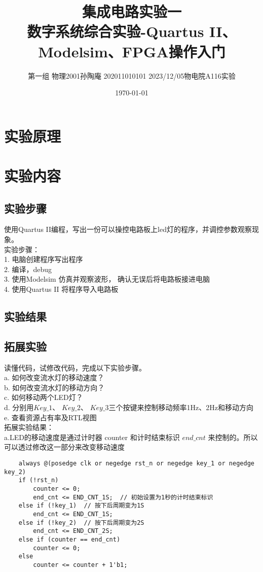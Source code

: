 \documentclass[12pt, a4paper, oneside]{article}
\title{集成电路实验一\\数字系统综合实验-Quartus II、Modelsim、FPGA操作入门}
\date{\today}
\author{第一组 物理2001孙陶庵 202011010101 2023/12/05物电院A116实验}
\begin{document}
\begin{spacing}{2.0}
\tableofcontents
\maketitle


\section{实验原理}
\section{实验内容}
\subsection{实验步骤}
使用Quartus II编程，写出一份可以操控电路板上led灯的程序，并调控参数观察现象。\\
实验步骤：\\
1.	电脑创建程序写出程序\\
2.	编译，debug\\
3.	使用Modelsim 仿真并观察波形， 确认无误后将电路板接进电脑\\
4.	使用Quartus II 将程序导入电路板\\

\subsection{实验结果}


\subsection{拓展实验}
读懂代码，试修改代码，完成以下实验步骤。\\
a.	如何改变流水灯的移动速度？\\
b.	如何改变流水灯的移动方向？\\
c.	如何移动两个LED灯？\\
d.	分别用$Key\_1$、 $Key\_2$、 $Key\_3$三个按键来控制移动频率1Hz、2Hz和移动方向\\
e.	查看资源占有率及RTL视图\\
拓展实验结果：\\
a.LED的移动速度是通过计时器 counter 和计时结束标识 $end\_cnt$ 来控制的。所以可以透过修改这一部分来改变移动速度
\begin{lstlisting}
    always @(posedge clk or negedge rst_n or negedge key_1 or negedge key_2)
    if (!rst_n)
        counter <= 0;
        end_cnt <= END_CNT_1S;  // 初始设置为1秒的计时结束标识
    else if (!key_1)  // 按下后周期变为1S
        end_cnt <= END_CNT_1S;
    else if (!key_2)  // 按下后周期变为2S
        end_cnt <= END_CNT_2S;
    else if (counter == end_cnt)
        counter <= 0;
    else 
        counter <= counter + 1'b1;


\end{lstlisting}
\end{spacing}
\end{document}
